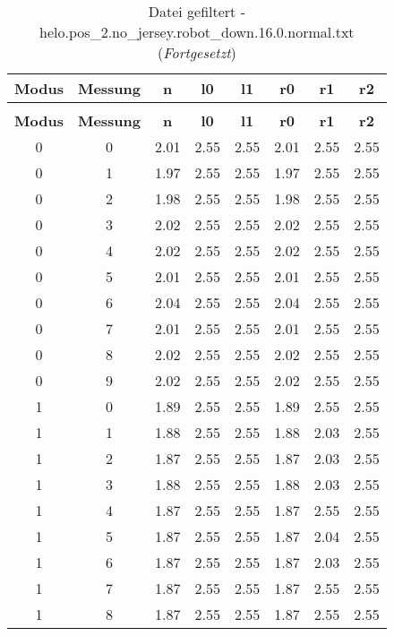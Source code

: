 \clearpage{}
\begin{longtable}{|c|c||c||c|c||c|c|c|}
	\caption{Datei gefiltert - helo.pos\_2.no\_jersey.robot\_down.16.0.normal.txt} \label{tab:helo.pos-2.no-jersey.robot-down.16.0.normal.txt} \\ \hline
	\textbf{Modus} & \textbf{Messung} & \textbf{n} & \textbf{l0} & \textbf{l1} & \textbf{r0} & \textbf{r1} & \textbf{r2}\\ \hline
	\endfirsthead
	\caption[]{Datei gefiltert - helo.pos\_2.no\_jersey.robot\_down.16.0.normal.txt (\emph{Fortgesetzt})} \\ \hline
	\textbf{Modus} & \textbf{Messung} & \textbf{n} & \textbf{l0} & \textbf{l1} & \textbf{r0} & \textbf{r1} & \textbf{r2}\\ \hline
	\endhead
	0 & 0 & 2.01 & 2.55 & 2.55 & 2.01 & 2.55 & 2.55 \\ \hline
	0 & 1 & 1.97 & 2.55 & 2.55 & 1.97 & 2.55 & 2.55 \\ \hline
	0 & 2 & 1.98 & 2.55 & 2.55 & 1.98 & 2.55 & 2.55 \\ \hline
	0 & 3 & 2.02 & 2.55 & 2.55 & 2.02 & 2.55 & 2.55 \\ \hline
	0 & 4 & 2.02 & 2.55 & 2.55 & 2.02 & 2.55 & 2.55 \\ \hline
	0 & 5 & 2.01 & 2.55 & 2.55 & 2.01 & 2.55 & 2.55 \\ \hline
	0 & 6 & 2.04 & 2.55 & 2.55 & 2.04 & 2.55 & 2.55 \\ \hline
	0 & 7 & 2.01 & 2.55 & 2.55 & 2.01 & 2.55 & 2.55 \\ \hline
	0 & 8 & 2.02 & 2.55 & 2.55 & 2.02 & 2.55 & 2.55 \\ \hline
	0 & 9 & 2.02 & 2.55 & 2.55 & 2.02 & 2.55 & 2.55 \\ \hline
	1 & 0 & 1.89 & 2.55 & 2.55 & 1.89 & 2.55 & 2.55 \\ \hline
	1 & 1 & 1.88 & 2.55 & 2.55 & 1.88 & 2.03 & 2.55 \\ \hline
	1 & 2 & 1.87 & 2.55 & 2.55 & 1.87 & 2.03 & 2.55 \\ \hline
	1 & 3 & 1.88 & 2.55 & 2.55 & 1.88 & 2.03 & 2.55 \\ \hline
	1 & 4 & 1.87 & 2.55 & 2.55 & 1.87 & 2.55 & 2.55 \\ \hline
	1 & 5 & 1.87 & 2.55 & 2.55 & 1.87 & 2.04 & 2.55 \\ \hline
	1 & 6 & 1.87 & 2.55 & 2.55 & 1.87 & 2.03 & 2.55 \\ \hline
	1 & 7 & 1.87 & 2.55 & 2.55 & 1.87 & 2.55 & 2.55 \\ \hline
	1 & 8 & 1.87 & 2.55 & 2.55 & 1.87 & 2.55 & 2.55 \\ \hline

\end{longtable}
